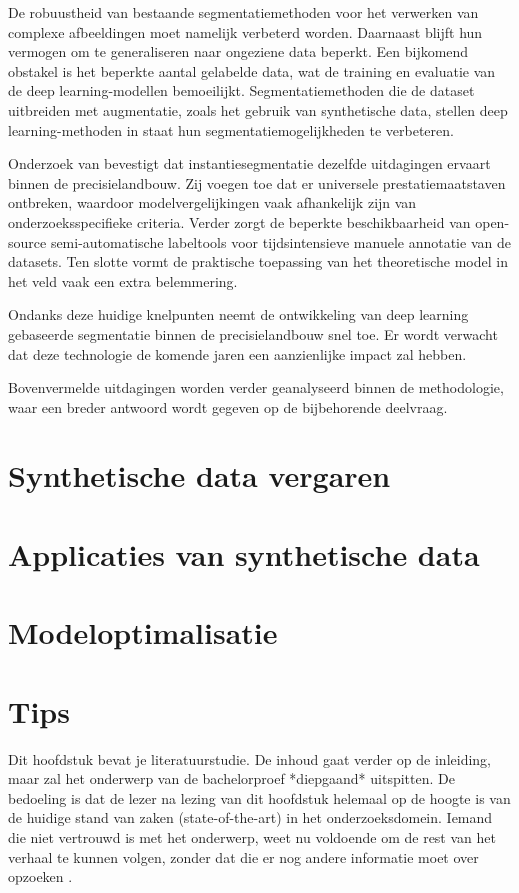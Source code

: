 De robuustheid van bestaande segmentatiemethoden voor het verwerken van complexe afbeeldingen moet namelijk verbeterd worden. Daarnaast blijft hun vermogen om te generaliseren naar ongeziene data beperkt. Een bijkomend obstakel is het beperkte aantal gelabelde data, wat de training en evaluatie van de deep learning-modellen bemoeilijkt. Segmentatiemethoden die de dataset uitbreiden met augmentatie, zoals het gebruik van synthetische data, stellen deep learning-methoden in staat hun segmentatiemogelijkheden te verbeteren.

Onderzoek van \textcite{Charisis2024} bevestigt dat instantiesegmentatie dezelfde uitdagingen ervaart binnen de precisielandbouw. Zij voegen toe dat er universele prestatiemaatstaven ontbreken, waardoor modelvergelijkingen vaak afhankelijk zijn van onderzoeksspecifieke criteria. Verder zorgt de beperkte beschikbaarheid van open-source semi-automatische labeltools voor tijdsintensieve manuele annotatie van de datasets. Ten slotte vormt de praktische toepassing van het theoretische model in het veld vaak een extra belemmering.

Ondanks deze huidige knelpunten neemt de ontwikkeling van deep learning gebaseerde segmentatie binnen de precisielandbouw snel toe. Er wordt verwacht dat deze technologie de komende jaren een aanzienlijke impact zal hebben.

Bovenvermelde uitdagingen worden verder geanalyseerd binnen de methodologie, waar een breder antwoord wordt gegeven op de bijbehorende deelvraag.

\section{Synthetische data vergaren}
\section{Applicaties van synthetische data}
\section{Modeloptimalisatie}

\section{Tips}

Dit hoofdstuk bevat je literatuurstudie. De inhoud gaat verder op de inleiding, maar zal het onderwerp van de bachelorproef *diepgaand* uitspitten. De bedoeling is dat de lezer na lezing van dit hoofdstuk helemaal op de hoogte is van de huidige stand van zaken (state-of-the-art) in het onderzoeksdomein. Iemand die niet vertrouwd is met het onderwerp, weet nu voldoende om de rest van het verhaal te kunnen volgen, zonder dat die er nog andere informatie moet over opzoeken \autocite{Pollefliet2011}.

